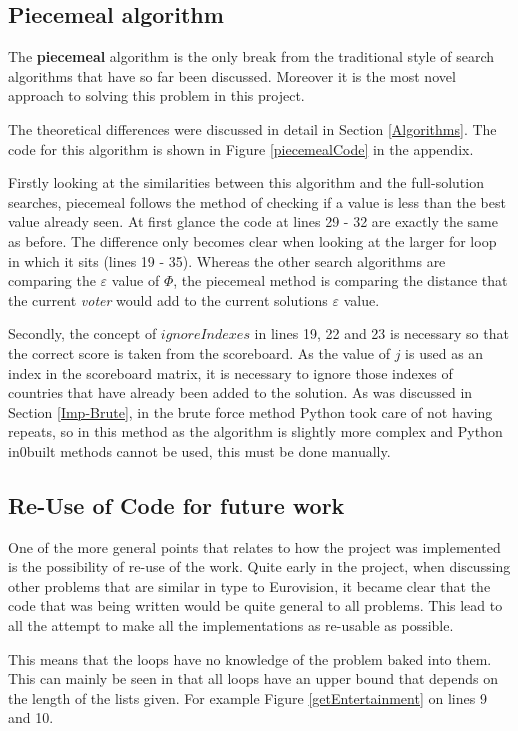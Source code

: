 \documentclass[12pt]{report}
\begin{document}
\subsection{Piecemeal algorithm}\label{Imp-Piecemeal}
The \textbf{piecemeal} algorithm is the only break from the traditional style of search algorithms that have so far been discussed. Moreover it is the most novel approach to solving this problem in this project.

The theoretical differences were discussed in detail in Section \ref{Algorithms}. The code for this algorithm is shown in Figure \ref{piecemealCode} in the appendix.

Firstly looking at the similarities between this algorithm and the full-solution searches, piecemeal follows the method of checking if a value is less than the best value already seen. At first glance the code at lines 29 - 32 are exactly the same as before. The difference only becomes clear when looking at the larger for loop in which it sits (lines 19 - 35). Whereas the other search algorithms are comparing the $\varepsilon$ value of $\Phi$, the piecemeal method is comparing the distance that the current \textit{voter} would add to the current solutions $\varepsilon$ value.

Secondly, the concept of $ignoreIndexes$ in lines 19, 22 and 23 is necessary so that the correct score is taken from the scoreboard. As the value of $j$ is used as an index in the scoreboard matrix, it is necessary to ignore those indexes of countries that have already been added to the solution. As was discussed in Section \ref{Imp-Brute}, in the brute force method Python took care of not having repeats, so in this method as the algorithm is slightly more complex and Python in0built methods cannot be used, this must be done manually.

\subsection{Re-Use of Code for future work}\label{Imp-Reuse}
One of the more general points that relates to how the project was implemented is the possibility of re-use of the work. Quite early in the project, when discussing other problems that are similar in type to Eurovision, it became clear that the code that was being written would be quite general to all problems. This lead to all the attempt to make all the implementations as re-usable as possible.

This means that the loops have no knowledge of the problem baked into them. This can mainly be seen in that all loops have an upper bound that depends on the length of the lists given. For example Figure \ref{getEntertainment} on lines 9 and 10. 
\end{document}
